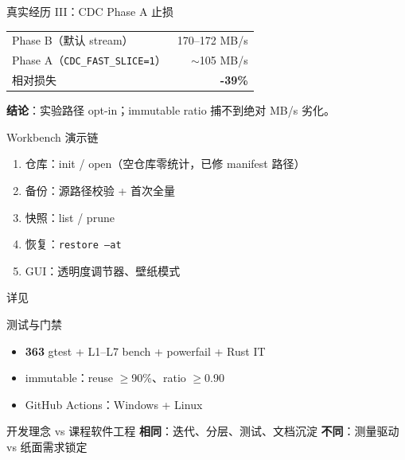 \documentclass[aspectratio=169,12pt,fontset=none]{ctexbeamer}
\begin{document}
\begin{frame}{真实经历 III：CDC Phase A 止损}
  \begin{table}
    \centering\small
    \begin{tabular}{@{}lr@{}}
    \toprule
    Phase B（默认 stream） & 170--172 MB/s \\
    Phase A（\texttt{CDC\_FAST\_SLICE=1}） & $\sim$105 MB/s \\
    相对损失 & \textbf{-39\%} \\
  \bottomrule
    \end{tabular}
  \end{table}
  \textbf{结论}：实验路径 opt-in；immutable ratio 捕不到绝对 MB/s 劣化。
\end{frame}

\begin{frame}{Workbench 演示链}
  \begin{enumerate}
    \item 仓库：init / open（空仓库零统计，已修 manifest 路径）
    \item 备份：源路径校验 + 首次全量
    \item 快照：list / prune
    \item 恢复：\texttt{restore --at}
    \item GUI：透明度调节器、壁纸模式
  \end{enumerate}
  \vspace{0.3em}
  \small 详见 
\end{frame}

\begin{frame}{测试与门禁}
  \begin{itemize}
    \item \textbf{363} gtest + L1--L7 bench + powerfail + Rust IT
    \item immutable：reuse $\geq$90\%、ratio $\geq$0.90
    \item GitHub Actions：Windows + Linux
  \end{itemize}
\end{frame}

\begin{frame}{开发理念 vs 课程软件工程}
  \resizebox{0.88\textwidth}{!}{%
    
  }
  \vspace{0.2em}
  \footnotesize
  \textbf{相同}：迭代、分层、测试、文档沉淀 \quad
  \textbf{不同}：测量驱动 vs 纸面需求锁定
\end{frame}
\end{document}
